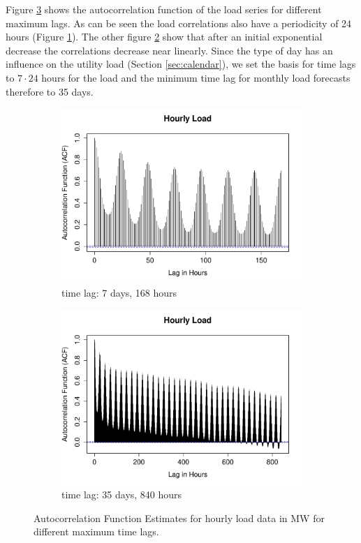 \documentclass[conference]{IEEEtran}
\begin{document}
Figure \ref{fig:acf-load} shows the autocorrelation function of the load series for different maximum lags. As can be seen the load correlations also have a periodicity of 24 hours (Figure \ref{subfig:acf-load-7days}). The other figure \ref{subfig:acf-load-35days} show that after an initial exponential decrease the correlations decrease near linearly. Since the type of day has an influence on the utility load (Section \ref{sec:calendar}), we set the basis for time lags to $7\cdot24$ hours for the load and the minimum time lag for monthly load forecasts therefore to 35 days.

\begin{figure}[!ht]
\centering
\begin{subfigure}[b]{.49\linewidth}
\includegraphics[width=\linewidth]{gfx/acf-load-7days.pdf}
\caption{time lag: 7 days, 168 hours}
\label{subfig:acf-load-7days}
\end{subfigure}
\begin{subfigure}[b]{.49\linewidth}
\includegraphics[width=\linewidth]{gfx/acf-load-35days.pdf}
\caption{time lag: 35 days, 840 hours}
\label{subfig:acf-load-35days}
\end{subfigure}
\caption{Autocorrelation Function Estimates for hourly load data in MW for different maximum time lags.}
\label{fig:acf-load}
\end{figure}
\end{document}
